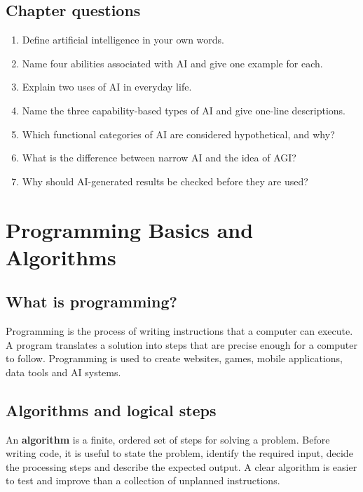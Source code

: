 \documentclass[11pt,openany,oneside]{book}
\newcommand{\keyterm}[1]{\textbf{\color{Navy}#1}}
\begin{document}
\section{Chapter questions}
\begin{enumerate}
\item Define artificial intelligence in your own words.
\item Name four abilities associated with AI and give one example for each.
\item Explain two uses of AI in everyday life.
\item Name the three capability-based types of AI and give one-line descriptions.
\item Which functional categories of AI are considered hypothetical, and why?
\item What is the difference between narrow AI and the idea of AGI?
\item Why should AI-generated results be checked before they are used?
\end{enumerate}

\chapter{Programming Basics and Algorithms}
\section{What is programming?}
Programming is the process of writing instructions that a computer can execute. A program translates a solution into steps that are precise enough for a computer to follow. Programming is used to create websites, games, mobile applications, data tools and AI systems.

\section{Algorithms and logical steps}
An \keyterm{algorithm} is a finite, ordered set of steps for solving a problem. Before writing code, it is useful to state the problem, identify the required input, decide the processing steps and describe the expected output. A clear algorithm is easier to test and improve than a collection of unplanned instructions.
\end{document}
